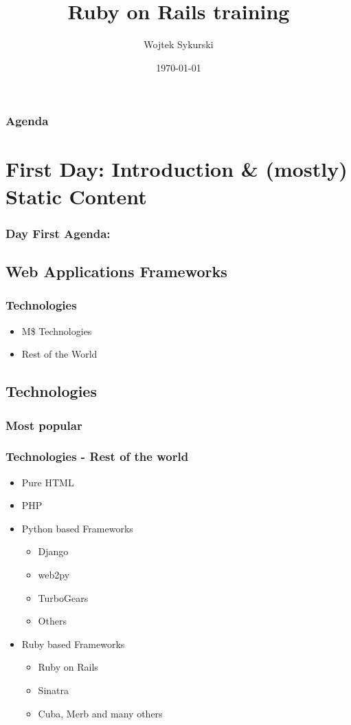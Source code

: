 \documentclass{beamer}
\title{Ruby on Rails training}
\author{Wojtek Sykurski}
\institute[Samsung R\&D]
{
  Samsung R\&D Poland \\
  \medskip
  \textit{w.sykurski@samsung.com}
}
\date{\today}
\begin{document}
\begin{frame}
  \titlepage 
\end{frame}

\begin{frame}
  \frametitle{Agenda}
  \tableofcontents[hideallsubsections]
\end{frame}

\section{First Day: Introduction \& (mostly) Static Content}
\begin{frame}
  \frametitle{Day First Agenda:}
  \tableofcontents
  [
  currentsection,
  currentsubsection,
  subsectionstyle=show/shaded/hide
  ]
\end{frame}

\subsection{Web Applications Frameworks}

\begin{frame}
  \frametitle{Technologies}
  \begin{itemize}
    \item M\$ Technologies
    \item Rest of the World
  \end{itemize}
  
\end{frame}

\subsection{Technologies}

\subsubsection{Most popular}

\begin{frame}
  \frametitle{Technologies - Rest of the world}
  \begin{itemize}
    \item Pure HTML
    \item PHP
    \item Python based Frameworks
      \begin{itemize}
        \item Django
        \item web2py
        \item TurboGears
        \item Others
      \end{itemize}
    \item Ruby based Frameworks
      \begin{itemize}
        \item Ruby on Rails
        \item Sinatra
        \item Cuba, Merb and many others
      \end{itemize}
  \end{itemize}
  
\end{frame}
\end{document}
